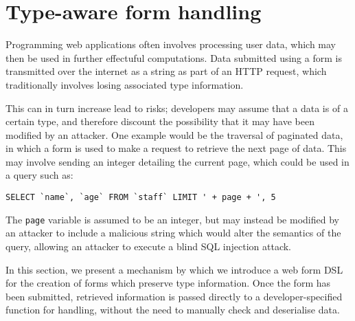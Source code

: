 \documentclass[preprint]{sigplanconf}
\begin{document}

\section{Type-aware form handling}
Programming web applications often involves processing user data, which may then be used in further effectuful computations. Data submitted using a form is transmitted over the internet as a string as part of an HTTP request, which traditionally involves losing associated type information. 

This can in turn increase lead to risks; developers may assume that a data is of a certain type, and therefore discount the possibility that it may have been modified by an attacker. One example would be the traversal of paginated data, in which a form is used to make a request to retrieve the next page of data. This may involve sending an integer detailing the current page, which could be used in a query such as:

{\small
\begin{verbatim}
SELECT `name`, `age` FROM `staff` LIMIT ' + page + ', 5
\end{verbatim}
}
The \texttt{page} variable is assumed to be an integer, but may instead be modified by an attacker to include a malicious string which would alter the semantics of the query, allowing an attacker to execute a blind SQL injection attack. %

In this section, we present a mechanism by which we introduce a web form DSL for the creation of forms which preserve type information. Once the form has been submitted, retrieved information is passed directly to a developer-specified function for handling, without the need to manually check and deserialise data. 
\end{document}
